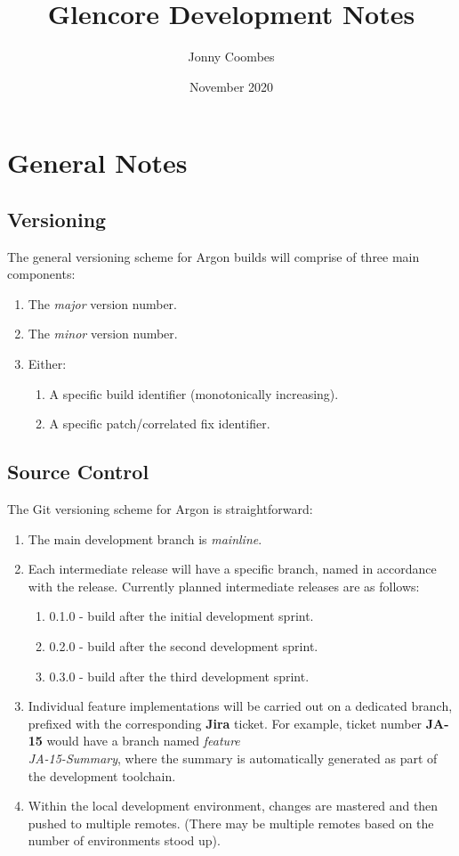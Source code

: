 \documentclass{book}
\title{Glencore Development Notes}
\author{Jonny Coombes}
\date{November 2020}
\begin{document}
\maketitle
{}
\newpage
\tableofcontents
\let\cleardoublepage=\clearpage
\newpage
{}

\chapter{General Notes}
\hoffset=0in
\evensidemargin=0in
\section{Versioning}
The general versioning scheme for Argon builds will comprise of three main components:
\begin{enumerate}
    \item The \textit{major} version number.
    \item The \textit{minor} version number.
    \item Either:
    \begin{enumerate}
        \item A specific build identifier (monotonically increasing).
        \item A specific patch/correlated fix identifier.
    \end{enumerate}
\end{enumerate}

\section{Source Control}
The Git versioning scheme for Argon is straightforward:
\begin{enumerate}
    \item The main development branch is \textit{mainline}.
    \item Each intermediate release will have a specific branch, named in accordance with the release.  Currently planned intermediate releases are as follows:
    \begin{enumerate}
        \item 0.1.0 - build after the initial development sprint.
        \item 0.2.0 - build after the second development sprint.
        \item 0.3.0 - build after the third development sprint.
    \end{enumerate}
    \item Individual feature implementations will be carried out on a dedicated branch, prefixed with the corresponding \textbf{Jira} ticket.  For example, ticket number \textbf{JA-15} would have a branch named \textit{feature\\JA-15-Summary}, where the summary is automatically generated as part of the development toolchain.
    \item Within the local development environment, changes are mastered and then pushed to multiple remotes.  (There may be multiple remotes based on the number of environments stood up).
\end{enumerate}
\end{document}
